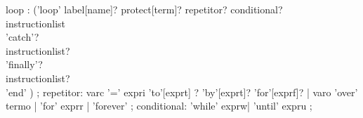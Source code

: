 \begin{rail}
loop : ('loop' label[name]? protect[term]?  repetitor? conditional? \\
            instructionlist \\
            'catch'? \\ instructionlist? \\
            'finally'? \\ instructionlist? \\
            'end'
                )
               ;
repetitor: varc '=' expri 'to'[exprt] ? 'by'[exprt]? 'for'[exprf]? |
                varo 'over' termo |
                'for' exprr |
                'forever'
                ;
conditional: 'while' exprw|
                    'until' expru
                ;
\end{rail}
